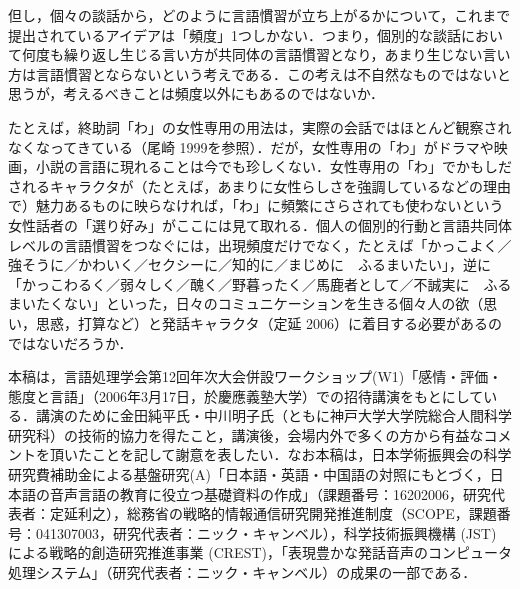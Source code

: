 \documentclass[japanese]{jnlp_1.3b}
\begin{document}
但し，個々の談話から，どのように言語慣習が立ち上がるかについて，これまで提出されているアイデアは「頻度」1つしかない．つまり，個別的な談話において何度も繰り返し生じる言い方が共同体の言語慣習となり，あまり生じない言い方は言語慣習とならないという考えである．この考えは不自然なものではないと思うが，考えるべきことは頻度以外にもあるのではないか．

たとえば，終助詞「わ」の女性専用の用法は，実際の会話ではほとんど観察されなくなってきている（尾崎 1999を参照）．だが，女性専用の「わ」がドラマや映画，小説の言語に現れることは今でも珍しくない．女性専用の「わ」でかもしだされるキャラクタが（たとえば，あまりに女性らしさを強調しているなどの理由で）魅力あるものに映らなければ，「わ」に頻繁にさらされても使わないという女性話者の「選り好み」がここには見て取れる．個人の個別的行動と言語共同体レベルの言語慣習をつなぐには，出現頻度だけでなく，たとえば「かっこよく／強そうに／かわいく／セクシーに／知的に／まじめに　ふるまいたい」，逆に「かっこわるく／弱々しく／醜く／野暮ったく／馬鹿者として／不誠実に　ふるまいたくない」といった，日々のコミュニケーションを生きる個々人の欲（思い，思惑，打算など）と発話キャラクタ（定延 2006）に着目する必要があるのではないだろうか．



\acknowledgment

本稿は，言語処理学会第12回年次大会併設ワークショップ(W1)「感情・評価・態度と言語」（2006年3月17日，於慶應義塾大学）での招待講演をもとにしている．講演のために金田純平氏・中川明子氏（ともに神戸大学大学院総合人間科学研究科）の技術的協力を得たこと，講演後，会場内外で多くの方から有益なコメントを頂いたことを記して謝意を表したい．なお本稿は，日本学術振興会の科学研究費補助金による基盤研究(A)「日本語・英語・中国語の対照にもとづく，日本語の音声言語の教育に役立つ基礎資料の作成」（課題番号：16202006，研究代表者：定延利之），総務省の戦略的情報通信研究開発推進制度（SCOPE，課題番号：041307003，研究代表者：ニック・キャンベル），科学技術振興機構 (JST) による戦略的創造研究推進事業 (CREST)，「表現豊かな発話音声のコンピュータ処理システム」（研究代表者：ニック・キャンベル）の成果の一部である．
\end{document}
